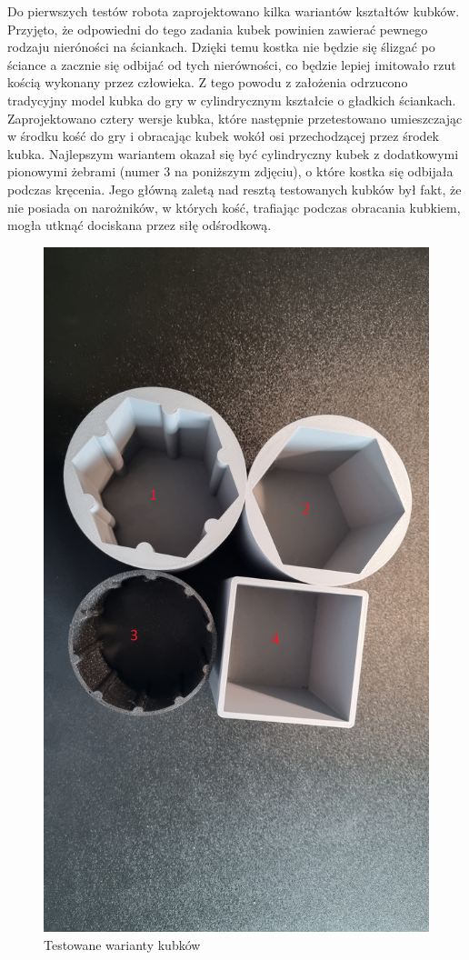 Do pierwszych testów robota zaprojektowano kilka wariantów kształtów kubków. Przyjęto, że odpowiedni do tego zadania kubek powinien
zawierać pewnego rodzaju nieróności na ściankach. Dzięki temu kostka nie będzie się ślizgać po ściance a zacznie się odbijać od tych nierówności, co 
będzie lepiej imitowało rzut kością wykonany przez człowieka. Z tego powodu z założenia odrzucono tradycyjny model kubka do gry w cylindrycznym kształcie 
o gładkich ściankach. Zaprojektowano cztery wersje kubka, które następnie przetestowano umieszczając w środku kość do gry i obracając kubek wokół osi przechodzącej przez środek kubka.
Najlepszym wariantem okazał się być cylindryczny kubek z dodatkowymi pionowymi żebrami (numer 3 na poniższym zdjęciu), o które kostka się odbijała podczas kręcenia. Jego główną zaletą
nad resztą testowanych kubków był fakt, że nie posiada on narożników, w których kość, trafiając podczas obracania kubkiem, mogła utknąć dociskana przez 
siłę odśrodkową.

\begin{figure}[H]
    \centering
    \includegraphics[width=0.65\linewidth, trim={35mm 380mm 20mm 240mm}, clip]{chapters/03-praca-wlasna/figures/kubki.jpg}
    \caption{\label{fig:kubki}Testowane warianty kubków}
\end{figure}

